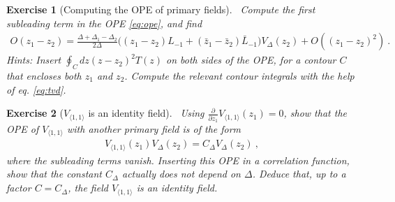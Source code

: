 \documentclass[12pt, a4paper]{article}
\theoremstyle{break}
\newtheorem{exo}{Exercise}[section]
\begin{document}
\begin{exo}[Computing the OPE of primary fields]
~\label{exo:ope}
 Compute the first subleading term in the OPE \eqref{eq:ope}, and find
 \begin{align}
  O(z_1-z_2) = \frac{\Delta+\Delta_1-\Delta_2}{2\Delta} \Big( (z_1-z_2)L_{-1}+(\bar z_1-\bar z_2)\bar L_{-1}\Big) V_{\Delta}(z_2) + O((z_1-z_2)^2)\ .
 \end{align}
Hints: Insert $\oint_C dz(z-z_2)^2 T(z)$ on both sides of the OPE, for a contour $C$ that encloses both $z_1$ and $z_2$. Compute the relevant contour integrals with the help of eq. \eqref{eq:tvd}.
\end{exo}

\begin{exo}[$V_{\langle 1,1\rangle}$ is an identity field]
~\label{exo:id}
Using $\frac{\partial}{\partial z_1} V_{\langle 1,1\rangle}(z_1)=0$, show that the OPE of $V_{\langle 1,1\rangle}$ with another primary field is of the form 
\begin{align}
 V_{\langle 1,1\rangle}(z_1)V_\Delta(z_2) = C_\Delta V_\Delta(z_2)\ ,
\end{align}
where the subleading terms vanish. Inserting this OPE in a correlation function, show that the constant $C_\Delta$ actually does not depend on $\Delta$. Deduce that, up to a factor $C=C_\Delta$, the field $V_{\langle 1,1\rangle}$ is an identity field.
\end{exo}
\end{document}

